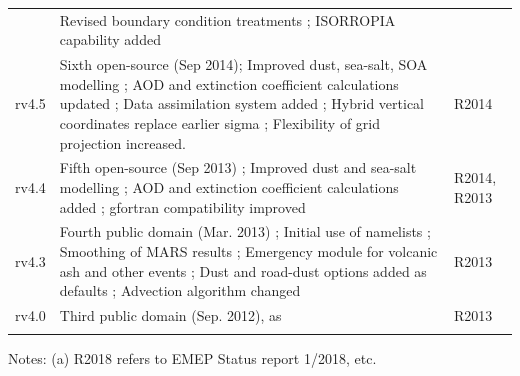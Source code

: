 \begin{table}
\begin{footnotesize}
\begin{tabular}{lp{11cm}l}
       & Revised boundary condition treatments %
       ; ISORROPIA capability added & \\
rv4.5  & Sixth open-source (Sep 2014);                    
        Improved dust, sea-salt, SOA modelling          %
       ; AOD and extinction coefficient calculations  updated %
       ; Data assimilation system added %
       ; Hybrid vertical coordinates replace earlier sigma %
       ; Flexibility of grid projection increased. & R2014\\
rv4.4   & Fifth open-source (Sep 2013) %
       ; Improved dust and sea-salt modelling   %
       ; AOD and extinction coefficient calculations added %
       ; gfortran compatibility improved            %
                  & R2014, R2013\\
rv4.3   & Fourth public domain (Mar. 2013)  %
       ; Initial use of namelists           %
       ; Smoothing of MARS results         %
       ; Emergency module for volcanic ash and other events%
       ; Dust and road-dust options added as defaults %
       ; Advection algorithm changed  %
             & R2013\\ 
rv4.0   & Third public domain (Sep. 2012), as \citet{Simpson_et_al:EMEP}            & R2013\\ 
        &                                                &\\
\hline
\end{tabular}
Notes: (a) R2018 refers to EMEP Status report 1/2018, etc.
\end{footnotesize}
\end{table}
